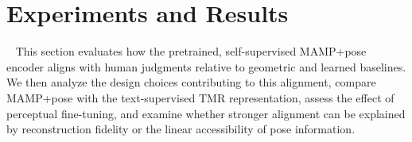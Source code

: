\documentclass[letterpaper]{article} %
\begin{document}

\section{Experiments and Results}~\label{sec:pipeline}
This section evaluates how the pretrained, self-supervised MAMP+pose encoder aligns with human judgments relative to geometric and learned baselines. We then analyze the design choices contributing to this alignment, compare MAMP+pose with the text-supervised TMR representation, assess the effect of perceptual fine-tuning, and examine whether stronger alignment can be explained by reconstruction fidelity or the linear accessibility of pose information.
\end{document}
